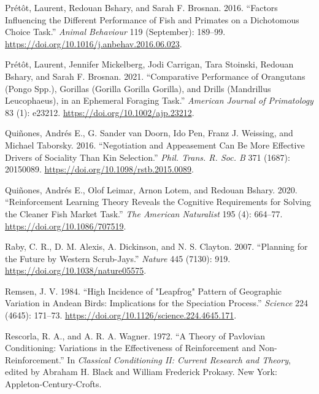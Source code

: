 \documentclass[
  12pt,
]{article}
\newlength{\cslhangindent}
\newlength{\cslentryspacingunit} %
\newenvironment{CSLReferences}[2] %
 {%
  \setlength{\parindent}{0pt}
  \ifodd #1
  \let\oldpar\par
  \def\par{\hangindent=\cslhangindent\oldpar}
  \fi
  \setlength{\parskip}{#2\cslentryspacingunit}
 }%
 {}
\begin{document}
\begin{CSLReferences}{1}{0}
\leavevmode{}%
Prétôt, Laurent, Redouan Bshary, and Sarah F. Brosnan. 2016. {``Factors
Influencing the Different Performance of Fish and Primates on a
Dichotomous Choice Task.''} \emph{Animal Behaviour} 119 (September):
189--99. \url{https://doi.org/10.1016/j.anbehav.2016.06.023}.

\leavevmode{}%
Prétôt, Laurent, Jennifer Mickelberg, Jodi Carrigan, Tara Stoinski,
Redouan Bshary, and Sarah F. Brosnan. 2021. {``Comparative Performance
of Orangutans ({Pongo} Spp.), Gorillas ({Gorilla} Gorilla Gorilla), and
Drills ({Mandrillus} Leucophaeus), in an Ephemeral Foraging Task.''}
\emph{American Journal of Primatology} 83 (1): e23212.
\url{https://doi.org/10.1002/ajp.23212}.

\leavevmode{}%
Quiñones, Andrés E., G. Sander van Doorn, Ido Pen, Franz J. Weissing,
and Michael Taborsky. 2016. {``Negotiation and Appeasement Can Be More
Effective Drivers of Sociality Than Kin Selection.''} \emph{Phil. Trans.
R. Soc. B} 371 (1687): 20150089.
\url{https://doi.org/10.1098/rstb.2015.0089}.

\leavevmode{}%
Quiñones, Andrés E., Olof Leimar, Arnon Lotem, and Redouan Bshary. 2020.
{``Reinforcement {Learning} {Theory} {Reveals} the {Cognitive}
{Requirements} for {Solving} the {Cleaner} {Fish} {Market} {Task}.''}
\emph{The American Naturalist} 195 (4): 664--77.
\url{https://doi.org/10.1086/707519}.

\leavevmode{}%
Raby, C. R., D. M. Alexis, A. Dickinson, and N. S. Clayton. 2007.
{``Planning for the Future by Western Scrub-Jays.''} \emph{Nature} 445
(7130): 919. \url{https://doi.org/10.1038/nature05575}.

\leavevmode{}%
Remsen, J. V. 1984. {``High {Incidence} of "{Leapfrog}" {Pattern} of
{Geographic} {Variation} in {Andean} {Birds}: {Implications} for the
{Speciation} {Process}.''} \emph{Science} 224 (4645): 171--73.
\url{https://doi.org/10.1126/science.224.4645.171}.

\leavevmode{}%
Rescorla, R. A., and A. R. A. Wagner. 1972. {``A Theory of {Pavlovian}
Conditioning: Variations in the Effectiveness of Reinforcement and
Non-Reinforcement.''} In \emph{Classical Conditioning {II}: Current
Research and Theory}, edited by Abraham H. Black and William Frederick
Prokasy. New York: Appleton-Century-Crofts.


\end{CSLReferences}
\end{document}
